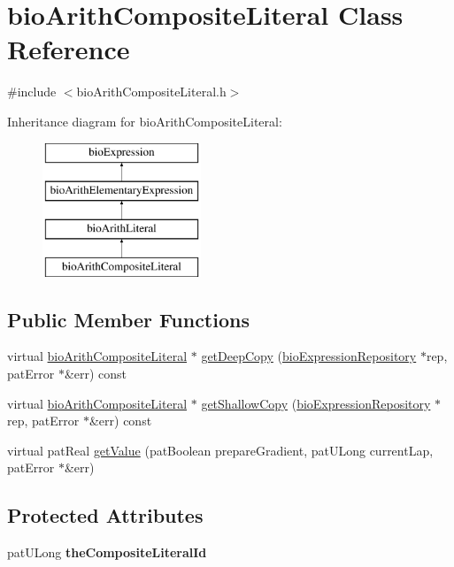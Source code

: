 \hypertarget{classbio_arith_composite_literal}{}\section{bio\+Arith\+Composite\+Literal Class Reference}
\label{classbio_arith_composite_literal}


{\ttfamily \#include $<$bio\+Arith\+Composite\+Literal.\+h$>$}

Inheritance diagram for bio\+Arith\+Composite\+Literal\+:\begin{figure}[H]
\begin{center}
\leavevmode
\includegraphics[height=4.000000cm]{classbio_arith_composite_literal}
\end{center}
\end{figure}
\subsection*{Public Member Functions}
\begin{DoxyCompactItemize}
\item 
virtual \hyperlink{classbio_arith_composite_literal}{bio\+Arith\+Composite\+Literal} $\ast$ \hyperlink{classbio_arith_composite_literal_aff5a7801055d4691dcc1ee84cc9fa201}{get\+Deep\+Copy} (\hyperlink{classbio_expression_repository}{bio\+Expression\+Repository} $\ast$rep, pat\+Error $\ast$\&err) const
\item 
virtual \hyperlink{classbio_arith_composite_literal}{bio\+Arith\+Composite\+Literal} $\ast$ \hyperlink{classbio_arith_composite_literal_a99216fa86facca3b310a985c69116136}{get\+Shallow\+Copy} (\hyperlink{classbio_expression_repository}{bio\+Expression\+Repository} $\ast$rep, pat\+Error $\ast$\&err) const
\item 
virtual pat\+Real \hyperlink{classbio_arith_composite_literal_ab0471105a849e772c1e93f5b45b66acb}{get\+Value} (pat\+Boolean prepare\+Gradient, pat\+U\+Long current\+Lap, pat\+Error $\ast$\&err)
\end{DoxyCompactItemize}
\subsection*{Protected Attributes}
\begin{DoxyCompactItemize}
\item 
\mbox{\label{classbio_arith_composite_literal_a2532b2dd05d30e3cbcb7f3051d1b90b6}} 
pat\+U\+Long {\bfseries the\+Composite\+Literal\+Id}
\end{DoxyCompactItemize}



